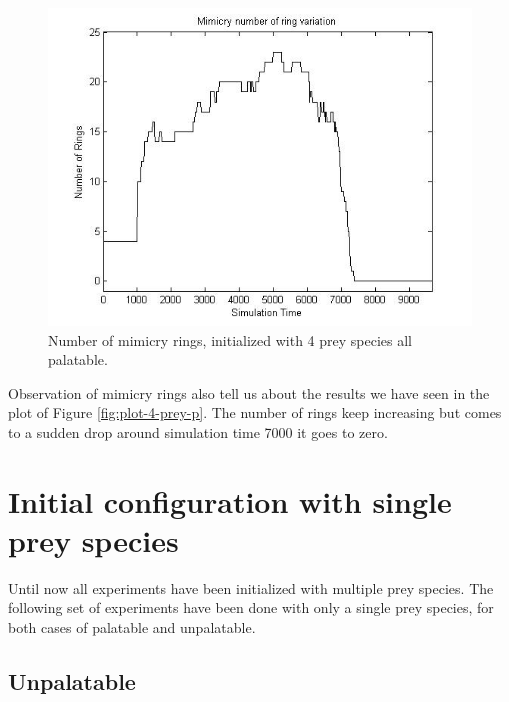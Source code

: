 \begin{figure}[H]
	\centering
	\includegraphics[scale=0.50]{images/ringSize8k-4Prey-p}
	\caption{Number of mimicry rings, initialized with 4 prey species all palatable.}
	\label{fig:ringSize8k-4-Prey-p}
\end{figure}

Observation of mimicry rings also tell us about the results we have seen in the plot of Figure \ref{fig:plot-4-prey-p}. The number of rings keep increasing but comes to a sudden drop around simulation time 7000 it goes to zero.

\section{Initial configuration with single prey species}
Until now all experiments have been initialized with multiple prey species. The following set of experiments have been done with only a single prey species, for both cases of palatable and unpalatable.

\subsection{Unpalatable}
\label{subsec:single-prey-unpalatable}

